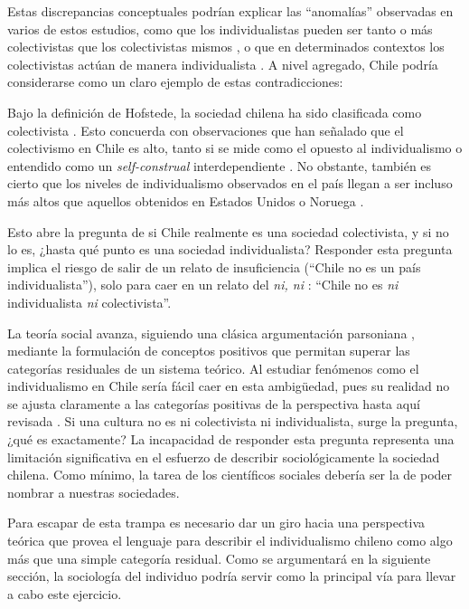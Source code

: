 \documentclass[12pt,twoside]{templates/facsothesis}
\begin{document}
Estas discrepancias conceptuales podrían explicar las ``anomalías'' observadas en varios de estos estudios, como que los individualistas pueden ser tanto o más colectivistas que los colectivistas mismos \citep{oyserman2002}, o que en determinados contextos los colectivistas actúan de manera individualista \citep{voronov2002}. A nivel agregado, Chile podría considerarse como un claro ejemplo de estas contradicciones:

Bajo la definición de Hofstede, la sociedad chilena ha sido clasificada como colectivista \citep{rojas2008}. Esto concuerda con observaciones que han señalado que el colectivismo en Chile es alto, tanto si se mide como el opuesto al individualismo \citep{oyserman2002} o entendido como un \emph{self-construal} interdependiente \citep{benavides2020}. No obstante, también es cierto que los niveles de individualismo observados en el país llegan a ser incluso más altos que aquellos obtenidos en Estados Unidos \citep{oyserman2002} o Noruega \citep{kolstad2009}.

Esto abre la pregunta de si Chile realmente es una sociedad colectivista, y si no lo es, ¿hasta qué punto es una sociedad individualista? Responder esta pregunta implica el riesgo de salir de un relato de insuficiencia (``Chile no es un país individualista''), solo para caer en un relato del \emph{ni, ni} \citep{martuccelli2010}: ``Chile no es \emph{ni} individualista \emph{ni} colectivista''.

La teoría social avanza, siguiendo una clásica argumentación parsoniana \citep{bouzanis2019}, mediante la formulación de conceptos positivos que permitan superar las categorías residuales de un sistema teórico. Al estudiar fenómenos como el individualismo en Chile sería fácil caer en esta ambigüedad, pues su realidad no se ajusta claramente a las categorías positivas de la perspectiva hasta aquí revisada \citep{bouzanis2019}. Si una cultura no es ni colectivista ni individualista, surge la pregunta, ¿qué es exactamente? La incapacidad de responder esta pregunta representa una limitación significativa en el esfuerzo de describir sociológicamente la sociedad chilena. Como mínimo, la tarea de los científicos sociales debería ser la de poder nombrar a nuestras sociedades.

Para escapar de esta trampa es necesario dar un giro hacia una perspectiva teórica que provea el lenguaje para describir el individualismo chileno como algo más que una simple categoría residual. Como se argumentará en la siguiente sección, la sociología del individuo podría servir como la principal vía para llevar a cabo este ejercicio.
\end{document}
